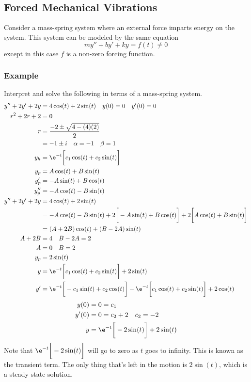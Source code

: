 \documentclass{math}
\begin{document}
\subsection*{Forced Mechanical Vibrations}
Consider a mass-spring system where an external force imparts energy on the
system. This system can be modeled by the same equation
\[ my''+by'+ky = f(t) \ne 0 \]
except in this case \( f \) is a non-zero forcing function.

\subsubsection*{Example}
Interpret and solve the following in terms of a mass-spring system.
\begin{align*}
  y''+2y'+2y &= 4\cos(t)+2\sin(t) \quad y(0) = 0 \quad y'(0) = 0 \\
  r^2+2r+2 &= 0 \\
  r &= \frac{-2\pm\sqrt{4-(4)(2)}}{2} \\
  &= -1\pm i \quad \alpha = -1 \quad \beta = 1 \\
  y_h &= \e^{-t}\bigg[c_1\cos(t)+c_2\sin(t)\bigg] \\
  y_p &= A\cos(t)+B\sin(t) \\
  y_p' &= -A\sin(t)+B\cos(t) \\
  y_p'' &= -A\cos(t)-B\sin(t) \\
  y''+2y'+2y &= 4\cos(t)+2\sin(t) \\
  &= -A\cos(t)-B\sin(t)+2\bigg[-A\sin(t)+B\cos(t)\bigg]+
    2\bigg[A\cos(t)+B\sin(t)\bigg] \\
  &= (A+2B)\cos(t)+(B-2A)\sin(t) \\
  A+2B &= 4 \quad B-2A = 2 \\
  A &= 0 \quad B = 2 \\
  y_p &= 2\sin(t) \\
  y &= \e^{-t}\bigg[c_1\cos(t)+c_2\sin(t)\bigg]+2\sin(t) \\
  y' &= \e^{-t}\bigg[-c_1\sin(t)+c_2\cos(t)\bigg]-
    \e^{-t}\bigg[c_1\cos(t)+c_2\sin(t)\bigg]+2\cos(t)
\end{align*}
\begin{align*}
  y(0) &= 0 = c_1 \\
  y'(0) &= 0 = c_2+2 \quad c_2 = -2 \\
  y &= \e^{-t}\bigg[-2\sin(t)\bigg]+2\sin(t) \\
\end{align*}
Note that \( \e^{-t}\bigg[-2\sin(t)\bigg] \) will go to zero as \( t \) goes
to infinity. This is known as the transient term. The only thing that's left
in the motion is \( 2\sin(t) \), which is a steady state solution.
\end{document}
